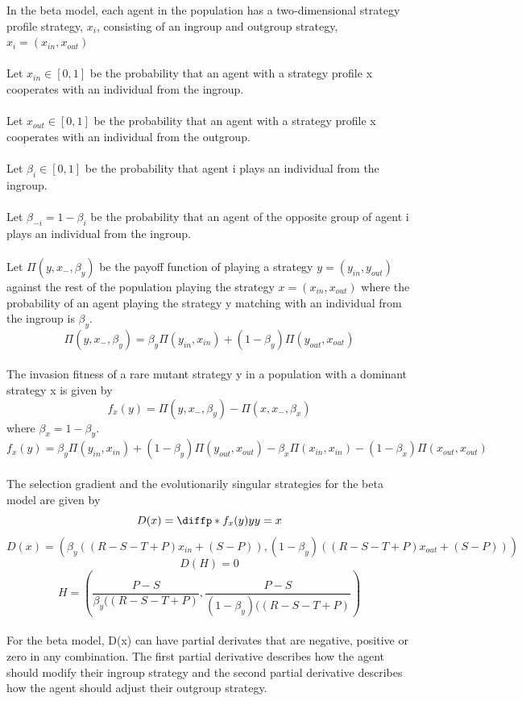 \documentclass[]{llncs}
\begin{document}
In the beta model, each agent in the population has a two-dimensional strategy profile strategy, $x_i$, consisting of an ingroup and outgroup strategy,  $x_i = (x_{in}, x_{out})$\\
\\
Let $x_{in} \in [0,1]$ be the probability that an agent with a strategy profile x cooperates with an individual from the ingroup. \\
\\
Let $x_{out} \in [0,1]$ be the probability that an agent with a strategy profile x cooperates with an individual from the outgroup. \\
\\
Let $\beta_i \in [0,1]$ be the probability that agent i plays an individual from the ingroup.\\
\\
Let $\beta_{-i} = 1 -\beta_i $ be the probability that an agent of the opposite group of agent i plays an individual from the ingroup.\\
\\
Let $ \Pi ( y, x_{-}, \beta_y)$ be the payoff function of playing a strategy $y = (y_{in}, y_{out}) $ against the rest of the population playing the strategy $x = (x_{in}, x_{out})$ where the probability of an agent playing the strategy y matching with an individual from the ingroup is $\beta_y$.
\[
\Pi ( y, x_{-} , \beta_y) = \beta_y \Pi ( y_{in}, x_{in}) + (1-\beta_y) \Pi ( y_{out}, x_{out} ) 
\]
\\
The invasion fitness of a rare mutant strategy y in a population with a dominant strategy x is given by 
\[
f_x(y) = \Pi ( y, x_{-} , \beta_y) - \Pi ( x, x_{-} , \beta_x) 
\]
where $\beta_x = 1 - \beta_y.$
\[
f_x(y) = \beta_y \Pi ( y_{in}, x_{in}) + (1-\beta_y) \Pi ( y_{out}, x_{out} )  - \beta_x \Pi ( x_{in}, x_{in}) - (1-\beta_x) \Pi ( x_{out}, x_{out} ) 
\]
\\
The selection gradient and the evolutionarily singular strategies for the beta model are given by 
\[
D(x) = \diffp*{f_x(y)}{y}{y=x}
\]
\[
D(x) = (\beta_y((R - S - T + P) x_{in} + (S-P)), (1-\beta_y)((R - S - T + P) x_{out} + (S-P)))
\]
\[
D(H) = 0 
\]
\[
H = (\frac{P-S}{\beta_y((R - S - T + P)}, \frac{P-S}{(1-\beta_y)((R - S - T + P)}) 
\]
\\
For the beta model, D(x) can have partial derivates that are negative, positive or zero in any combination. The first partial derivative describes how the agent should modify their ingroup strategy and the second partial derivative describes how the agent should adjust their outgroup strategy. 
\end{document}
